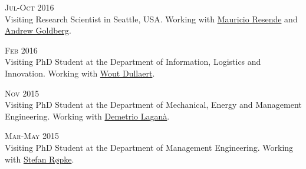 \begin{paracol}{2}
  \textsc{Jul-Oct 2016}
\switchcolumn
  \\
  Visiting Research Scientist in Seattle, USA. Working with \href{https://scholar.google.com/citations?user=KTmPx50AAAAJ}{Mauricio Resende} and \href{https://scholar.google.it/citations?user=U5iFVowAAAAJ}{Andrew Goldberg}.
\end{paracol}

\begin{paracol}{2}
  \textsc{Feb 2016}
\switchcolumn
  \\
  Visiting PhD Student at the Department of Information, Logistics and Innovation. Working with \href{https://scholar.google.com/citations?user=wjjCd5UAAAAJ}{Wout Dullaert}.
\end{paracol}

\begin{paracol}{2}
  \textsc{Nov 2015}
\switchcolumn
  \\
  Visiting PhD Student at the Department of Mechanical, Energy and Management Engineering. Working with \href{https://scholar.google.com/citations?user=r_qFOqgAAAAJ}{Demetrio Laganà}.
\end{paracol}

\begin{paracol}{2}
  \textsc{Mar-May 2015}
\switchcolumn
  \\
  Visiting PhD Student at the Department of Management Engineering. Working with \href{https://scholar.google.com/citations?user=sYi141QAAAAJ}{Stefan Røpke}.
\end{paracol}

%

%
